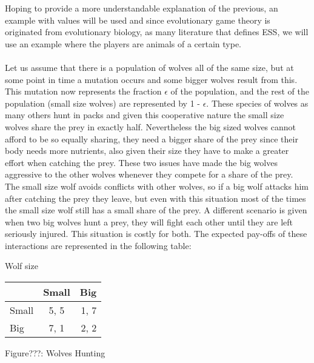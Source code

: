 \documentclass{article}
\begin{document}
Hoping to provide a more understandable explanation of the previous, an example with values will be used and since evolutionary game theory is originated from evolutionary biology, as many literature that defines ESS, we will use an example where the players are animals of a certain type.
\\\\Let us assume that there is a population of wolves all of the same size, but at some point in time a mutation occurs and some bigger wolves result from this. This mutation now represents the fraction $\epsilon$ of the population, and the rest of the population (small size wolves) are represented by 1 - $\epsilon$. These species of wolves as many others hunt in packs and given this cooperative nature the small size wolves share the prey in exactly half. Nevertheless the big sized wolves cannot afford to be so equally sharing, they need a bigger share of the prey since their body needs more nutrients, also given their size they have to make a greater effort when catching the prey. These two issues have made the big wolves aggressive to the other wolves whenever they compete for a share of the prey. The small size wolf avoids conflicts with other wolves, so if a big wolf attacks him after catching the prey they leave, but even with this situation most of the times the small size wolf still has a small share of the prey. A different scenario is given when two big wolves hunt a prey, they will fight each other until they are left seriously injured. This situation is costly for both. The expected pay-offs of these interactions are represented in the following table:
\begin{center}
Wolf size

\begin{tabular}{|l|c|r|}
\hline
 & Small & Big \\
\hline
Small & 5, 5 & 1, 7\\
\hline
 Big & 7, 1 & 2, 2\\
\hline
\end{tabular}
\end{center}
\begin{center}
	Figure???: Wolves Hunting
\end{center}
\end{document}
